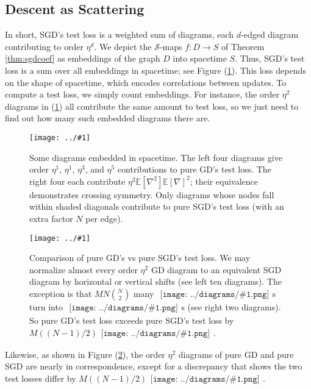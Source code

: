 \documentclass{article}
\newcommand{\Ss}{\mathcal{S}}
\newcommand{\expct}[1]{\mathbb{E}\left[#1\right]}
\newcommand{\plotmoo}[3]{
    \texttt{[image: ../\#1]}
}
\newcommand{\sdia}[1]{\begin{gathered}\texttt{[image: ../diagrams/\#1.png]}\end{gathered}}
\begin{document}
    \subsection{Descent as Scattering}
        In short, SGD's test loss is a weighted sum of diagrams, each $d$-edged
        diagram contributing to order $\eta^d$.  We depict the $\Ss$-maps 
        $f:D\to S$ of Theorem \ref{thm:sgdcoef} as embeddings of the graph $D$
        into spacetime $S$.  Thus, SGD's test loss is a sum over all embeddings
        in spacetime; see Figure (\ref{fig:spacetime}).  This loss depends on
        the shape of spacetime, which encodes correlations between updates.  To
        compute a test loss, we simply count embeddings.  For instance, the
        order $\eta^2$ diagrams in (\ref{fig:spacetime}) all contribute the
        same amount to test loss, so we just need to find out how many such
        embedded diagrams there are.   
        \begin{figure}[h!] 
            \centering  
            \plotmoo{diagrams/spacetime}{\columnwidth}{3.0cm}  
            \caption{
                Some diagrams embedded in spacetime.  The left four diagrams
                give order $\eta^1$, $\eta^1$, $\eta^3$, and $\eta^5$
                contributions to pure GD's test loss.  The right four each
                contribute $\eta^2 \expct{\nabla^2} \expct{\nabla}^2$; their
                equivalence demonstrates crossing symmetry.  Only diagrams
                whose nodes fall within shaded diagonals contribute to pure SGD's
                test loss (with an extra factor $N$ per edge). 
            }
            \label{fig:spacetime}
        \end{figure}
        \begin{figure}[h!] 
            \centering  
            \plotmoo{diagrams/spacetime-b}{\columnwidth}{3.0cm}
            \caption{
                Comparison of pure GD's vs pure SGD's test loss.  We may
                normalize almost every order $\eta^2$ GD diagram to an
                equivalent SGD diagram by horizontal or vertical shifts (see
                left ten diagrams).  The exception is that $MN{N\choose 2}$ many
                $\sdia{(01-2)(01-12)}$s turn into $\sdia{(0-1-2)(01-12)}$s (see
                right two diagrams).  So pure GD's test loss exceeds pure SGD's
                test loss by $M ((N-1)/2) \sdia{c(01-2)(01-12)}$.
            }
            \label{fig:vsmulti}
        \end{figure}
        Likewise, as shown in Figure (\ref{fig:vsmulti}), the order $\eta^2$
        diagrams of pure GD and pure SGD are nearly in correspondence, except
        for a discrepancy that shows the two test losses differ by $M ((N-1)/2)
        \sdia{c(01-2)(01-12)}$.
    
\end{document}
